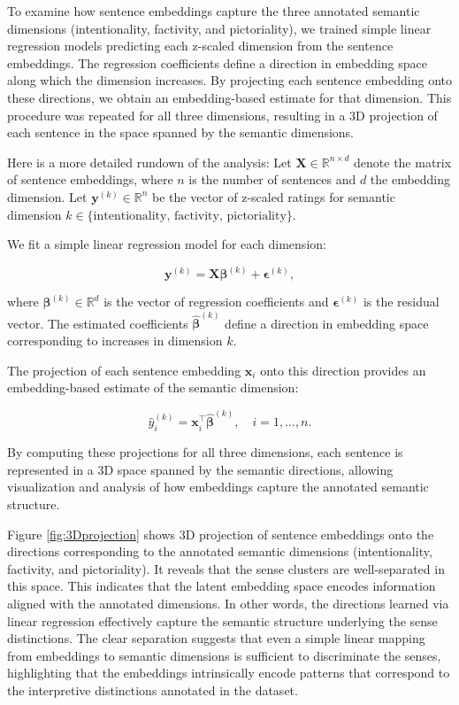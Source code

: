 \documentclass[
]{article}
\begin{document}
To examine how sentence embeddings capture the three annotated semantic
dimensions (intentionality, factivity, and pictoriality), we trained
simple linear regression models predicting each z-scaled dimension from
the sentence embeddings. The regression coefficients define a direction
in embedding space along which the dimension increases. By projecting
each sentence embedding onto these directions, we obtain an
embedding-based estimate for that dimension. This procedure was repeated
for all three dimensions, resulting in a 3D projection of each sentence
in the space spanned by the semantic dimensions.

Here is a more detailed rundown of the analysis: Let
\(\mathbf{X} \in \mathbb{R}^{n \times d}\) denote the matrix of sentence
embeddings, where \(n\) is the number of sentences and \(d\) the
embedding dimension. Let \(\mathbf{y}^{(k)} \in \mathbb{R}^n\) be the
vector of z-scaled ratings for semantic dimension
\(k \in \{\text{intentionality, factivity, pictoriality}\}\).

We fit a simple linear regression model for each dimension:

\[
\mathbf{y}^{(k)} = \mathbf{X} \boldsymbol{\beta}^{(k)} + \boldsymbol{\epsilon}^{(k)},
\]

where \(\boldsymbol{\beta}^{(k)} \in \mathbb{R}^d\) is the vector of
regression coefficients and \(\boldsymbol{\epsilon}^{(k)}\) is the
residual vector. The estimated coefficients
\(\hat{\boldsymbol{\beta}}^{(k)}\) define a direction in embedding space
corresponding to increases in dimension \(k\).

The projection of each sentence embedding \(\mathbf{x}_i\) onto this
direction provides an embedding-based estimate of the semantic
dimension:

\[
\hat{y}^{(k)}_i = \mathbf{x}_i^\top \hat{\boldsymbol{\beta}}^{(k)}, \quad i = 1, \dots, n.
\]

By computing these projections for all three dimensions, each sentence
is represented in a 3D space spanned by the semantic directions,
allowing visualization and analysis of how embeddings capture the
annotated semantic structure.

Figure \ref{fig:3Dprojection} shows 3D projection of sentence embeddings
onto the directions corresponding to the annotated semantic dimensions
(intentionality, factivity, and pictoriality). It reveals that the sense
clusters are well-separated in this space. This indicates that the
latent embedding space encodes information aligned with the annotated
dimensions. In other words, the directions learned via linear regression
effectively capture the semantic structure underlying the sense
distinctions. The clear separation suggests that even a simple linear
mapping from embeddings to semantic dimensions is sufficient to
discriminate the senses, highlighting that the embeddings intrinsically
encode patterns that correspond to the interpretive distinctions
annotated in the dataset.
\end{document}

